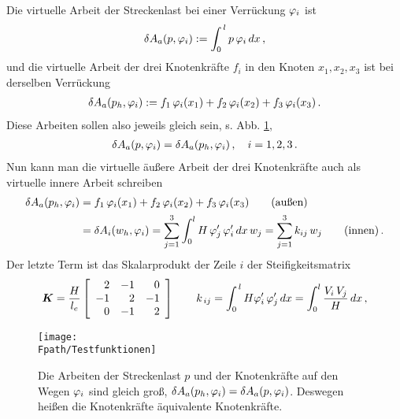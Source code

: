 \noindent Die virtuelle Arbeit der Streckenlast bei einer Verr\"{u}ckung $\varphi_i$ ist
\begin{align}
 \delta A_a(p,\varphi_i) := \int_0^{\,l} p \,\varphi_i \,dx \,,
\end{align}
und die virtuelle Arbeit der drei Knotenkr\"{a}fte $f_i$ in den Knoten $x_1,x_2,x_3$ ist bei derselben Verr\"{u}ckung
\begin{align}
 \delta
A_a(p_{h},\varphi_i) := f_1\,\varphi_i(x_1)+  f_2\,\varphi_i(x_2) + f_3\,\varphi_i(x_3)\,.
\end{align}
Diese Arbeiten sollen also jeweils gleich sein, s. Abb. \ref{Testfunktionen},
\begin{align}\label{G11}
\delta A_a(p,\varphi_i) = \delta A_a(p_{h},\varphi_i)\,, \quad i = 1,2,3\,.
\end{align}
Nun kann man die virtuelle \"{a}u{\ss}ere Arbeit der drei Knotenkr\"{a}fte auch als virtuelle innere Arbeit schreiben
\begin{align}
 \delta A_a(p_{h},\varphi_i) &= f_1\,\varphi_i(x_1)+  f_2\,\varphi_i(x_2) + f_3\,\varphi_i(x_3) \qquad \text{(au{\ss}en)} \nonumber \\
 &= \delta A_i(w_h,\varphi_i)= \sum_{j = 1}^3\int_{0}^{l}H\,\varphi_j'\,\varphi_i'\,dx\, w_j = \sum_{j = 1}^3 k_{ij}\,w_j\qquad \text{(innen)}\,.
\end{align}
Der letzte Term ist das Skalarprodukt der Zeile $i$ der Steifigkeitsmatrix
\begin{align}\label{Eq10}
 \mbox{\boldmath $K$} = \frac{H}{l_{e}}\left[ \begin{array}{r r r}
 2 & -1 & 0 \\
 -1 & 2 & -1 \\
  0 & -1 & 2 \\
 \end{array}
  \right] \qquad k_{\,ij} = \int_0^{\,l} H \varphi_i'  \, \varphi_j'  \,dx = \int_{0}^{l} \frac{V_i\,V_j}{H}\,dx\,,
\end{align}
\begin{figure}[tbp] \centering
\if {} \sidecaption \fi
\texttt{[image: \\Fpath/Testfunktionen]}
\caption{Die Arbeiten der Streckenlast $p$ und der Knotenkr\"{a}fte
auf den Wegen $\varphi_i$ sind gleich gro{\ss}, $\delta A_a(p_h,\varphi_i) = \delta
A_a(p,\varphi_i)$. Deswegen hei{\ss}en die Knotenkr\"{a}fte \"{a}quivalente Knotenkr\"{a}fte.} \label{Testfunktionen}
\end{figure}%
